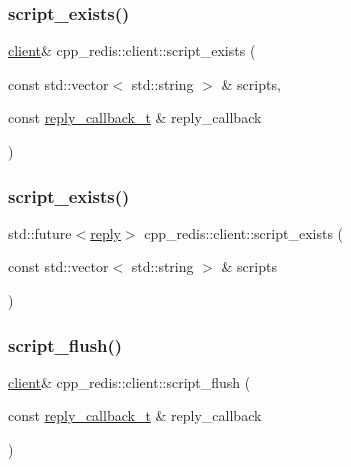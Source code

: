 \subsubsection{\texorpdfstring{script\+\_\+exists()}{script\_exists()}\hspace{0.1cm}{\footnotesize\ttfamily [1/2]}}
{\footnotesize\ttfamily \hyperlink{classcpp__redis_1_1client}{client}\& cpp\+\_\+redis\+::client\+::script\+\_\+exists (\begin{DoxyParamCaption}\item[{const std\+::vector$<$ std\+::string $>$ \&}]{scripts,  }\item[{const \hyperlink{classcpp__redis_1_1client_a061a1140d36d2eaeda82b09a0bb3f9f2}{reply\+\_\+callback\+\_\+t} \&}]{reply\+\_\+callback }\end{DoxyParamCaption})}

\mbox{\label{classcpp__redis_1_1client_ab55eac91086b7746d731c8405f901016}} 
\subsubsection{\texorpdfstring{script\+\_\+exists()}{script\_exists()}\hspace{0.1cm}{\footnotesize\ttfamily [2/2]}}
{\footnotesize\ttfamily std\+::future$<$\hyperlink{classcpp__redis_1_1reply}{reply}$>$ cpp\+\_\+redis\+::client\+::script\+\_\+exists (\begin{DoxyParamCaption}\item[{const std\+::vector$<$ std\+::string $>$ \&}]{scripts }\end{DoxyParamCaption})}

\mbox{\label{classcpp__redis_1_1client_a6d885c8b61bfbb74245be8d040813637}} 
\subsubsection{\texorpdfstring{script\+\_\+flush()}{script\_flush()}\hspace{0.1cm}{\footnotesize\ttfamily [1/2]}}
{\footnotesize\ttfamily \hyperlink{classcpp__redis_1_1client}{client}\& cpp\+\_\+redis\+::client\+::script\+\_\+flush (\begin{DoxyParamCaption}\item[{const \hyperlink{classcpp__redis_1_1client_a061a1140d36d2eaeda82b09a0bb3f9f2}{reply\+\_\+callback\+\_\+t} \&}]{reply\+\_\+callback }\end{DoxyParamCaption})}

